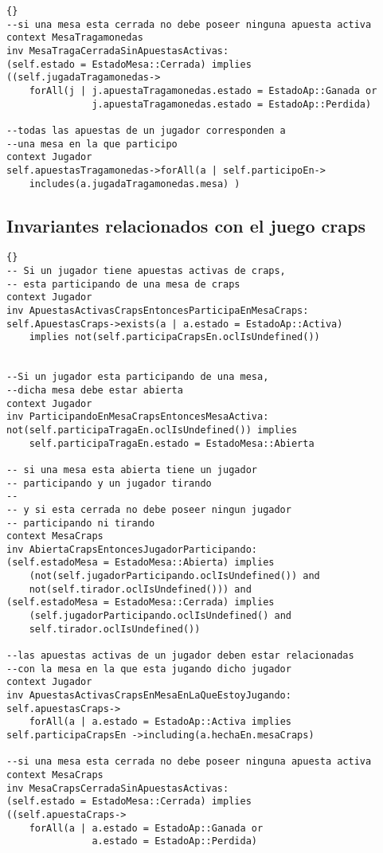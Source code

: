 \begin{framed}
\begin{lstlisting}[frame=trbl]{}
--si una mesa esta cerrada no debe poseer ninguna apuesta activa
context MesaTragamonedas
inv MesaTragaCerradaSinApuestasActivas:
(self.estado = EstadoMesa::Cerrada) implies 
((self.jugadaTragamonedas->
    forAll(j | j.apuestaTragamonedas.estado = EstadoAp::Ganada or 
               j.apuestaTragamonedas.estado = EstadoAp::Perdida)

--todas las apuestas de un jugador corresponden a 
--una mesa en la que participo
context Jugador
self.apuestasTragamonedas->forAll(a | self.participoEn->
    includes(a.jugadaTragamonedas.mesa) )
\end{lstlisting}

\subsection{Invariantes relacionados con el juego craps}

\lstset{language=ocl}
\lstset{commentstyle=\textit}
\begin{lstlisting}[frame=trbl]{}
-- Si un jugador tiene apuestas activas de craps,
-- esta participando de una mesa de craps
context Jugador
inv ApuestasActivasCrapsEntoncesParticipaEnMesaCraps:
self.ApuestasCraps->exists(a | a.estado = EstadoAp::Activa)
    implies not(self.participaCrapsEn.oclIsUndefined())
    
    
--Si un jugador esta participando de una mesa, 
--dicha mesa debe estar abierta
context Jugador
inv ParticipandoEnMesaCrapsEntoncesMesaActiva:
not(self.participaTragaEn.oclIsUndefined()) implies
    self.participaTragaEn.estado = EstadoMesa::Abierta

-- si una mesa esta abierta tiene un jugador 
-- participando y un jugador tirando
--
-- y si esta cerrada no debe poseer ningun jugador 
-- participando ni tirando
context MesaCraps
inv AbiertaCrapsEntoncesJugadorParticipando:
(self.estadoMesa = EstadoMesa::Abierta) implies 
    (not(self.jugadorParticipando.oclIsUndefined()) and
    not(self.tirador.oclIsUndefined())) and
(self.estadoMesa = EstadoMesa::Cerrada) implies 
    (self.jugadorParticipando.oclIsUndefined() and
    self.tirador.oclIsUndefined())
    
--las apuestas activas de un jugador deben estar relacionadas 
--con la mesa en la que esta jugando dicho jugador
context Jugador
inv ApuestasActivasCrapsEnMesaEnLaQueEstoyJugando:
self.apuestasCraps->
    forAll(a | a.estado = EstadoAp::Activa implies 
self.participaCrapsEn ->including(a.hechaEn.mesaCraps)

--si una mesa esta cerrada no debe poseer ninguna apuesta activa
context MesaCraps
inv MesaCrapsCerradaSinApuestasActivas:
(self.estado = EstadoMesa::Cerrada) implies 
((self.apuestaCraps->
    forAll(a | a.estado = EstadoAp::Ganada or 
               a.estado = EstadoAp::Perdida)


\end{lstlisting}
\end{framed}
